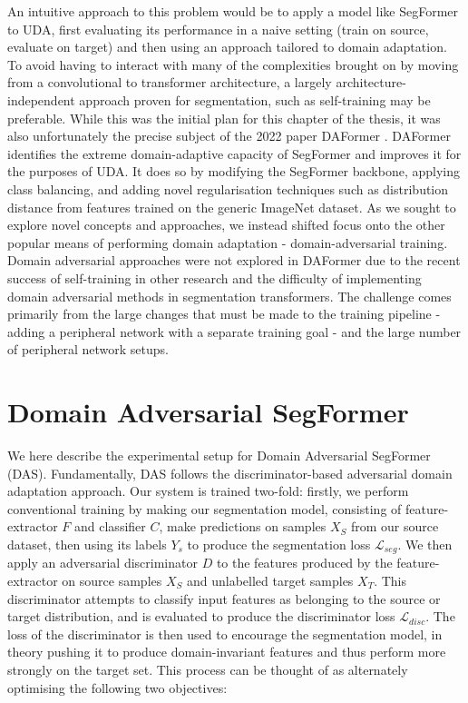 \documentclass[a4paper,12pt]{report}
\begin{document}
An intuitive approach to this problem would be to apply a model like SegFormer to UDA, first evaluating its performance in a naive setting (train on source, evaluate on target) and then using an approach tailored to domain adaptation. To avoid having to interact with many of the complexities brought on by moving from a convolutional to transformer architecture, a largely architecture-independent approach proven for segmentation, such as self-training \cite{zou_domain_2018} may be preferable. While this was the initial plan for this chapter of the thesis, it was also unfortunately the precise subject of the 2022 paper DAFormer \cite{hoyer_daformer_2022}. DAFormer identifies the extreme domain-adaptive capacity of SegFormer and improves it for the purposes of UDA. It does so by modifying the SegFormer backbone, applying class balancing, and adding novel regularisation techniques such as distribution distance from features trained on the generic ImageNet dataset. As we sought to explore novel concepts and approaches, we instead shifted focus onto the other popular means of performing domain adaptation - domain-adversarial training. Domain adversarial approaches were not explored in DAFormer due to the recent success of self-training in other research and the difficulty of implementing domain adversarial methods in segmentation transformers. The challenge comes primarily from the large changes that must be made to the training pipeline - adding a peripheral network with a separate training goal - and the large number of peripheral network setups.

\section{Domain Adversarial SegFormer}

We here describe the experimental setup for Domain Adversarial SegFormer (DAS). Fundamentally, DAS follows the discriminator-based adversarial domain adaptation approach. Our system is trained two-fold: firstly, we perform conventional training by making our segmentation model, consisting of feature-extractor $F$ and classifier $C$, make predictions on samples $X_S$ from our source dataset, then using its labels $Y_s$ to produce the segmentation loss $\mathcal{L}_{seg}$. We then apply an adversarial discriminator $D$ to the features produced by the feature-extractor on source samples $X_S$ and unlabelled target samples $X_T$. This discriminator attempts to classify input features as belonging to the source or target distribution, and is evaluated to produce the discriminator loss $\mathcal{L}_{disc}$. The loss of the discriminator is then used to encourage the segmentation model, in theory pushing it to produce domain-invariant features and thus perform more strongly on the target set. This process can be thought of as alternately optimising the following two objectives:
\end{document}
